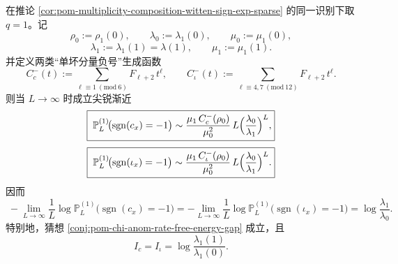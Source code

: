 \begin{theorem}\label{thm:pom-multiplicity-composition-chi-anomaly-sharp-rate}
在推论 \ref{cor:pom-multiplicity-composition-witten-sign-exp-sparse} 的同一识别下取 \(q=1\)。记
\[
\rho_0:=\rho_1(0),
\qquad
\lambda_0:=\lambda_1(0),
\qquad
\mu_0:=\mu_1(0),
\]
\[
\lambda_1:=\lambda_1(1)=\lambda(1),
\qquad
\mu_1:=\mu_1(1).
\]
并定义两类“单坏分量负号”生成函数
\[
C_c^-(t):=\sum_{\ell\equiv 1\ (\mathrm{mod}\ 6)}F_{\ell+2}\,t^\ell,
\qquad
C_\iota^-(t):=\sum_{\ell\equiv 4,7\ (\mathrm{mod}\ 12)}F_{\ell+2}\,t^\ell.
\]
则当 \(L\to\infty\) 时成立尖锐渐近
\[
\boxed{\;
\mathbb P_L^{(1)}\!\bigl(\operatorname{sgn}(c_x)=-1\bigr)
\sim
\frac{\mu_1\,C_c^-(\rho_0)}{\mu_0^2}\,
L\Bigl(\frac{\lambda_0}{\lambda_1}\Bigr)^L,}
\]
\[
\boxed{\;
\mathbb P_L^{(1)}\!\bigl(\operatorname{sgn}(\iota_x)=-1\bigr)
\sim
\frac{\mu_1\,C_\iota^-(\rho_0)}{\mu_0^2}\,
L\Bigl(\frac{\lambda_0}{\lambda_1}\Bigr)^L.}
\]
因而
\[
\boxed{\;
-\lim_{L\to\infty}\frac{1}{L}\log \mathbb P_L^{(1)}\!\bigl(\operatorname{sgn}(c_x)=-1\bigr)
=
-\lim_{L\to\infty}\frac{1}{L}\log \mathbb P_L^{(1)}\!\bigl(\operatorname{sgn}(\iota_x)=-1\bigr)
=
\log\frac{\lambda_1}{\lambda_0}.}
\]
特别地，猜想 \ref{conj:pom-chi-anom-rate-free-energy-gap} 成立，且
\[
I_c=I_\iota=\log\frac{\lambda_1(1)}{\lambda_1(0)}.
\]
\end{theorem}
